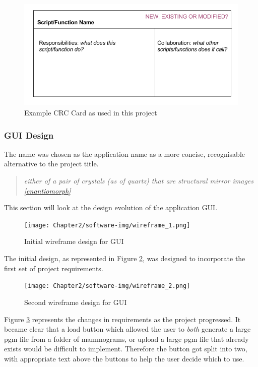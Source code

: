\begin{figure}[H]
  \center
  \includegraphics[scale=0.5]{Chapter2/software-img/crc.png}
  \caption{Example CRC Card as used in this project}
  \label{fig:crc}
\end{figure}

\subsubsection{GUI Design}

The name  was chosen as the application name as a more concise, recognisable alternative to the project title.

\begin{quotation}
  \textit{either of a pair of crystals (as of quartz) that are structural mirror images \ref{enantiomorph}}
\end{quotation}

This section will look at the design evolution of the application GUI.

\begin{figure}[H]
  \center
  \texttt{[image: Chapter2/software-img/wireframe\_1.png]}
  \caption{Initial wireframe design for GUI}
  \label{fig:wireframe1}
\end{figure}

The initial design, as represented in Figure \ref{fig:wireframe1}, was designed to incorporate the first set of project requirements.

\begin{figure}[H]
  \center
  \texttt{[image: Chapter2/software-img/wireframe\_2.png]}
  \caption{Second wireframe design for GUI}
  \label{fig:wireframe2}
\end{figure}

Figure \ref{fig:wireframe2} represents the changes in requirements as the project progressed. It became clear that a load button which allowed the user to \textit{both} generate a large pgm file from a folder of mammograms, or upload a large pgm file that already exists would be difficult to implement. Therefore the button got split into two, with appropriate text above the buttons to help the user decide which to use.

